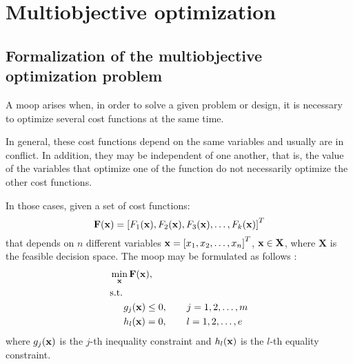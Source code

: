 \chapter{Multiobjective optimization}
\label{chap:Multi-objective}
{} 

\section{Formalization of the multiobjective optimization problem}
\label{sec:MOOPForm}
%
A \gls{moop} arises when, in order to solve a given problem or design, it is necessary to optimize several cost functions at the same time. 

In general, these cost functions depend on the same variables and usually are in conflict.  In addition, they may be independent of one another, that is, the value of the variables that optimize one of the function do not necessarily optimize the other cost functions.

In those cases, given a set of cost functions:
\begin{equation}
\mathbf{F}(\mathbf{x})=\left[F_1(\mathbf{x}), F_2(\mathbf{x}), F_3(\mathbf{x}), \ldots, F_k(\mathbf{x})\right]^T
\label{eq:functions}
\end{equation}
%
that depends on $n$ different variables $\mathbf{x}=\left[x_1, x_2, \ldots, x_n \right]^T$, $\mathbf{x} \in \mathbf{X}$, where $\mathbf{X}$ is the feasible decision space. The \gls{moop} may be formulated as follows \citep{Marler2004}:%
%
\begin{subequations}%
	\begin{align}%
	&\min_\xv \mathbf{F}(\xv), \label{eq:Min01}\\ %
	&\text{s.t.}\nonumber\\%
	& \hspace{5mm} g_j(\xv) \leq 0, \qquad j=1,2,\ldots,m  \label{eq:Min02}\\ %
	& \hspace{5mm} h_l(\xv) = 0, \qquad l=1,2,\ldots,e  \label{eq:Min03}%
	\end{align}%
	\label{eq:OptProb}%
\end{subequations}%
%
where $g_j(\mathbf{x})$ is the $j$-th inequality constraint and $h_l(\mathbf{x})$ is the $l$-th equality constraint. 
%
